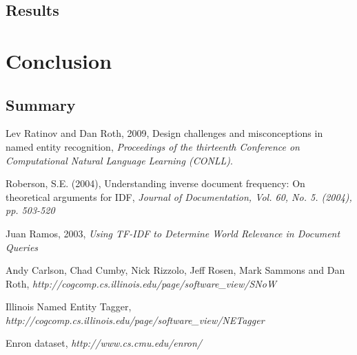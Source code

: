 \documentclass[senior,oneside]{UIUC}
\begin{document}
\section{Results}

\chapter{Conclusion}
\section{Summary}


% 


\begin{thebibliography}{9}

  Lev Ratinov and Dan Roth, 2009,
  Design challenges and misconceptions in named entity recognition,
  \emph{Proceedings of the thirteenth Conference on Computational Natural Language Learning (CONLL)}.

Roberson, S.E. (2004),
Understanding inverse document frequency: On theoretical arguments for IDF,
 \emph{Journal of Documentation, Vol. 60, No. 5. (2004), pp. 503-520}

  Juan Ramos, 2003,
  \emph{Using TF-IDF to Determine World Relevance in Document Queries}

 Andy Carlson, Chad Cumby, Nick Rizzolo, Jeff Rosen, Mark Sammons and Dan Roth, 
 \emph{http://cogcomp.cs.illinois.edu/page/software\_view/SNoW}

Illinois Named Entity Tagger, 
\emph{http://cogcomp.cs.illinois.edu/page/software\_view/NETagger}

  Enron dataset,
  \emph{http://www.cs.cmu.edu/\texttildelow{}enron/}
 
\end{thebibliography}
\end{document}
